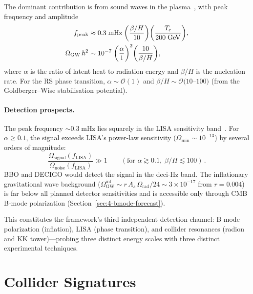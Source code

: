 The dominant contribution is from sound waves in the plasma~\cite{ch4:Hindmarsh2017}, with peak frequency and amplitude
\begin{align}
  f_{\mathrm{peak}} &\approx 0.3\;\mathrm{mHz}\;\biggl(\frac{\beta/H}{10}\biggr)\biggl(\frac{T_c}{200\;\mathrm{GeV}}\biggr),\label{eq:4-gw-pt}\\
  \Omega_{\mathrm{GW}}\, h^2 &\sim 10^{-7}\;\biggl(\frac{\alpha}{1}\biggr)^2\biggl(\frac{10}{\beta/H}\biggr),\notag
\end{align}
where $\alpha$ is the ratio of latent heat to radiation energy and $\beta/H$ is the nucleation rate.  For the RS phase transition, $\alpha \sim \mathcal{O}(1)$ and $\beta/H \sim \mathcal{O}(10$--$100)$ (from the Goldberger--Wise stabilisation potential).

\paragraph{Detection prospects.} The peak frequency $\sim 0.3\;\mathrm{mHz}$ lies squarely in the LISA sensitivity band~\cite{ch4:LISA2017}.  For $\alpha \geq 0.1$, the signal exceeds LISA's power-law sensitivity ($\Omega_{\mathrm{min}} \sim 10^{-13}$) by several orders of magnitude:
\begin{equation}
  \frac{\Omega_{\mathrm{signal}}(f_{\mathrm{LISA}})}{\Omega_{\mathrm{noise}}(f_{\mathrm{LISA}})} \gg 1 \qquad (\text{for } \alpha \gtrsim 0.1,\; \beta/H \lesssim 100)\,.
  \label{eq:4-gw-snr}
\end{equation}
BBO and DECIGO would detect the signal in the deci-Hz band.  The inflationary gravitational wave background ($\Omega_{\mathrm{GW}}^{\mathrm{inf}} \sim r\, A_s\, \Omega_{\mathrm{rad}}/24 \sim 3 \times 10^{-17}$ from $r = 0.004$) is far below all planned detector sensitivities and is accessible only through CMB B-mode polarization (Section~\ref{sec:4-bmode-forecast}).

This constitutes the framework's third independent detection channel: B-mode polarization (inflation), LISA (phase transition), and collider resonances (radion and KK tower)---probing three distinct energy scales with three distinct experimental techniques.


\section{Collider Signatures}
\label{sec:4-collider}

